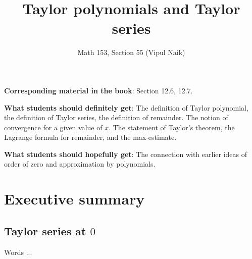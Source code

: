 \documentclass{amsart}
\title{Taylor polynomials and Taylor series}
\author{Math 153, Section 55 (Vipul Naik)}
\begin{document}
\maketitle

{\bf Corresponding material in the book}: Section 12.6, 12.7.

{\bf What students should definitely get}: The definition of Taylor
polynomial, the definition of Taylor series, the definition of
remainder. The notion of convergence for a given value of $x$. The
statement of Taylor's theorem, the Lagrange formula for remainder, and
the max-estimate.

{\bf What students should hopefully get}: The connection with earlier
ideas of order of zero and approximation by polynomials.

\section*{Executive summary}

\subsection{Taylor series at $0$}

Words ...
\end{document}
